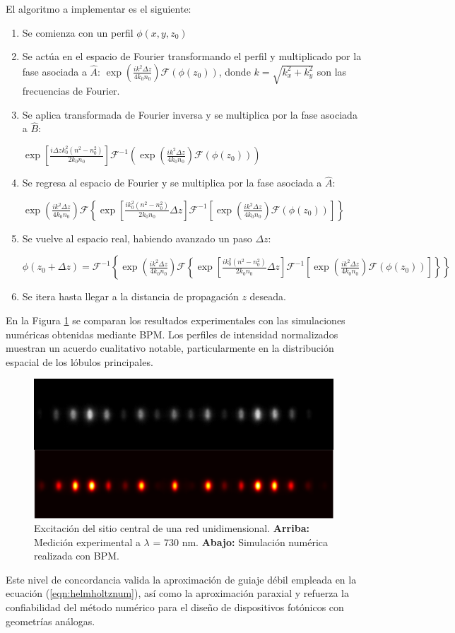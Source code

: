 El algoritmo a implementar es el siguiente:
\begin{enumerate}
	\item   Se comienza con un perfil $\phi(x, y, z_0)$
\item   Se actúa en el espacio de Fourier transformando el perfil y multiplicado por la fase asociada a $\hat{A}$: $\exp\left(\frac{ik^2\Delta z}{4k_0 n_0}\right)\mathcal{F}(\phi(z_0))$, donde $k=\sqrt{k_x^2 + k_y^2}$ son las frecuencias de Fourier.
\item   Se aplica transformada de Fourier inversa y se multiplica por la fase asociada a $\hat{B}$: 

$\exp\left[\frac{i\Delta z k_0^2(n^2-n_0^2)}{2 k_0n_0}\right]\mathcal{F}^{-1}\left(\exp\left(\frac{ik^2 \Delta z}{4k_0 n_0}\right)\mathcal{F}(\phi(z_0))\right)$
\item  Se regresa al espacio de Fourier y se multiplica por la fase asociada a $\hat{A}$:
 
$\exp\left(\frac{ik^2\Delta z}{4k_0 n_0}\right)\mathcal{F}\left\{\exp\left[\frac{ik_0^2(n^2-n_0^2)}{2 k_0n_0}\Delta z \right]\mathcal{F}^{-1}\left[\exp\left(\frac{ik^2\Delta z}{4k_0 n_0}\right)\mathcal{F}(\phi(z_0))\right]\right\}$
\item Se vuelve al espacio real, habiendo avanzado un paso $\Delta z$:

$\phi(z_0+\Delta z)=\mathcal{F}^{-1}\left\{\exp\left(\frac{ik^2\Delta z}{4k_0 n_0}\right)\mathcal{F}\left\{\exp\left[\frac{i k_0^2(n^2-n_0^2)}{2 k_0n_0}\Delta z\right]\mathcal{F}^{-1}\left[\exp\left(\frac{ik^2\Delta z}{4k_0 n_0}\right)\mathcal{F}(\phi(z_0))\right]\right\} \right\}$

\item Se itera hasta llegar a la distancia de propagación $z$ deseada.
\end{enumerate}
En la Figura \ref{fig:num-exp-comp} se comparan los resultados experimentales con las simulaciones numéricas obtenidas mediante BPM. Los perfiles de intensidad normalizados muestran un acuerdo cualitativo notable, particularmente en la distribución espacial de los lóbulos principales.
\begin{figure}[H]
\centering
\includegraphics[width=0.6\linewidth]{media/num_exp_comparison.png}
\caption{
Excitación del sitio central de una red unidimensional.
\textbf{Arriba:} Medición experimental a $\lambda$ = 730 nm.
\textbf{Abajo:} Simulación numérica realizada con BPM.
\label{fig:num-exp-comp}
}
\end{figure}
Este nivel de concordancia valida la aproximación de guiaje débil empleada en la ecuación (\ref{eqn:helmholtznum}), así como la aproximación paraxial y refuerza la confiabilidad del método numérico para el diseño de dispositivos fotónicos con geometrías análogas.




